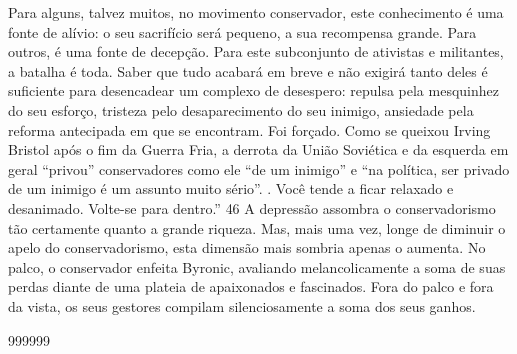  
\par
 
Para alguns, talvez muitos, no movimento conservador, este conhecimento é uma fonte de alívio: o seu sacrifício será pequeno, a sua recompensa grande. Para outros, é uma fonte de decepção. Para este subconjunto de ativistas e militantes, a batalha é toda. Saber que tudo acabará em breve e não exigirá tanto deles é suficiente para desencadear um complexo de desespero: repulsa pela mesquinhez do seu esforço, tristeza pelo desaparecimento do seu inimigo, ansiedade pela reforma antecipada em que se encontram. Foi forçado. Como se queixou Irving Bristol após o fim da Guerra Fria, a derrota da União Soviética e da esquerda em geral “privou” conservadores como ele “de um inimigo” e “na política, ser privado de um inimigo é um assunto muito sério”. . Você tende a ficar relaxado e desanimado. Volte-se para dentro.”
 {\color{blue} 46}  
A depressão assombra o conservadorismo tão certamente quanto a grande riqueza. Mas, mais uma vez, longe de diminuir o apelo do conservadorismo, esta dimensão mais sombria apenas o aumenta. No palco, o conservador enfeita Byronic, avaliando melancolicamente a soma de suas perdas diante de uma plateia de apaixonados e fascinados. Fora do palco e fora da vista, os seus gestores compilam silenciosamente a soma dos seus ganhos.
 
\par
  
 
999999
